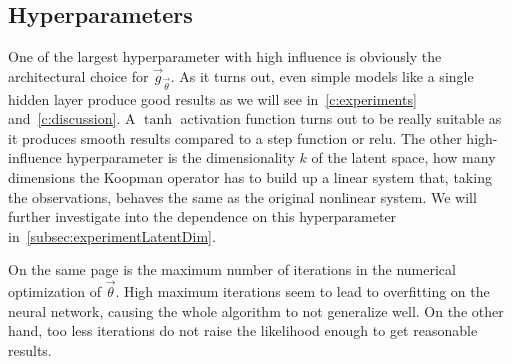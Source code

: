	\subsection{Hyperparameters}
		One of the largest hyperparameter with high influence is obviously the architectural choice for \( \vec{g}_{\vec{\theta}} \). As it turns out, even simple models like a single hidden layer produce good results as we will see in~\autoref{c:experiments} and~\autoref{c:discussion}. A \( \tanh \) activation function turns out to be really suitable as it produces smooth results compared to \eg a step function or \ac{relu}. The other high-influence hyperparameter is the dimensionality \(k\) of the latent space, \ie how many dimensions the Koopman operator has to build up a linear system that, taking the observations, behaves the same as the original nonlinear system. We will further investigate into the dependence on this hyperparameter in~\autoref{subsec:experimentLatentDim}.

		On the same page is the maximum number of iterations in the numerical optimization of \( \vec{\theta} \). High maximum iterations seem to lead to overfitting on the neural network, causing the whole algorithm to not generalize well. On the other hand, too less iterations do not raise the likelihood enough to get reasonable results.
